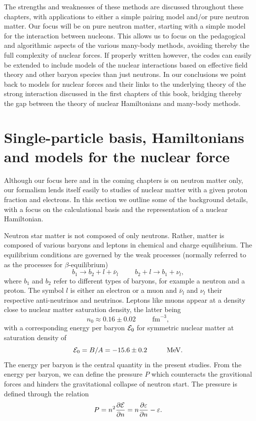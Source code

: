 The strengths and weaknesses of these methods are discussed throughout these chapters, with applications to either a simple pairing model
and/or pure neutron matter. Our focus will be on pure neutron matter, starting with a simple model for the interaction
between nucleons. This allows us to focus on the pedagogical and algorithmic aspects of the various many-body methods, avoiding thereby the  full complexity of nuclear forces.
If properly written however, the codes can easily be extended to include models of the nuclear interactions based on effective field theory \cite{eft} and other baryon species than just neutrons. In our conclusions we point  back to models for nuclear forces and their links to the underlying theory of the strong interaction discussed in the first chapters of this book, bridging thereby the gap between the theory of nuclear Hamiltonians and many-body methods. 


\section{Single-particle basis, Hamiltonians and models for the nuclear force}


Although our focus here and in the coming chapters is on neutron matter only, 
our formalism lends itself easily to studies of nuclear  matter 
with a given proton fraction and electrons. In this section we outline some of the background details, with a focus on the calculational basis
and the representation of a nuclear Hamiltonian. 

Neutron star matter is not composed of only neutrons. Rather, matter is composed of various baryons and leptons in chemical and charge equilibrium.
The equilibrium conditions are governed by the weak
processes (normally referred to as the processes for
$\beta$-equilibrium)
\begin{equation} 
      b_1 \rightarrow b_2 + l +\bar{\nu}_l \hspace{1cm} b_2 +l \rightarrow b_1 
+\nu_l,
      \label{eq:betadecay}
\end{equation}
where $b_1$ and $b_2$ refer to  different types of baryons, for example a neutron and a proton.  
The symbol $l$ is either an electron or a muon and  $\bar{\nu}_l $
and $\nu_l$ their respective anti-neutrinos and neutrinos. Leptons like muons 
appear at
a density close to nuclear matter saturation density, the latter being
\[
     n_0 \approx 0.16 \pm 0.02 \hspace{1cm} \mathrm{fm}^{-3},
\]
with a corresponding energy per baryon ${\cal E}_0$ 
for symmetric nuclear matter at saturation density of
\[
     {\cal E}_0 = B/A=-15.6\pm 0.2 \hspace{1cm} \mathrm{MeV}.
\]
The energy per baryon is the central quantity in the present studies. From the energy per baryon, we can define the pressure 
$P$ which counteracts the gravitional forces and hinders the gravitational collapse of neutron start. The pressure  is defined through the relation
\begin{equation}
    P=n^2\frac{\partial {\cal E}}{\partial n}=
      n\frac{\partial \varepsilon}{\partial n}-\varepsilon.
\end{equation}

